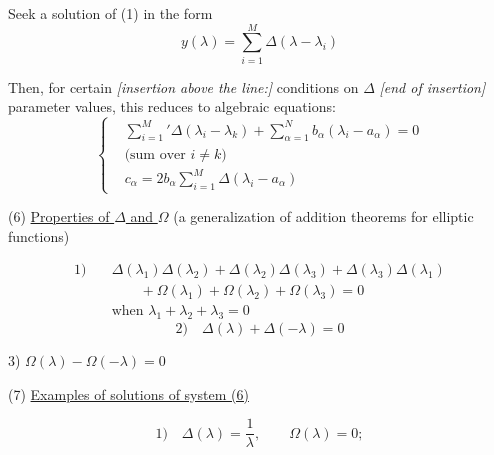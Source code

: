 Seek a solution of (1) in the form
\begin{equation*}
y(\lambda)=\sum_{i=1}^M\Delta(\lambda-\lambda_i)
\tag{4}
\end{equation*}

Then, for certain
\textit{[insertion above the line:]} conditions on $\Delta$
\textit{[end of insertion]}
parameter values, this reduces to algebraic equations:
\begin{equation*}
\left\{
\begin{aligned}
&\sum_{i=1}^{M}{}'\Delta(\lambda_i-\lambda_k)
 +\sum_{\alpha=1}^{N}b_\alpha(\lambda_i-a_\alpha)=0\\
&\text{(sum over }i\neq k\text{)}\\
&c_\alpha=2b_\alpha\sum_{i=1}^{M}\Delta(\lambda_i-a_\alpha)
\end{aligned}
\right.
\tag{5}
\end{equation*}

(6) \underline{Properties of $\Delta$ and $\Omega$}
\qquad (a generalization of addition theorems for elliptic functions)

\begin{equation*}
\begin{aligned}
1)\quad &\Delta(\lambda_1)\Delta(\lambda_2)+\Delta(\lambda_2)\Delta(\lambda_3)
+\Delta(\lambda_3)\Delta(\lambda_1)\\
&\qquad +\Omega(\lambda_1)+\Omega(\lambda_2)+\Omega(\lambda_3)=0\\
&\text{when }\lambda_1+\lambda_2+\lambda_3=0
\end{aligned}
\end{equation*}
\begin{equation*}
2)\quad \Delta(\lambda)+\Delta(-\lambda)=0
\end{equation*}

3) 
$\Omega(\lambda)-\Omega(-\lambda)=0$

(7) \underline{Examples of solutions of system (6)}

\begin{equation*}
1)\quad \Delta(\lambda)=\frac{1}{\lambda},\qquad \Omega(\lambda)=0;
\end{equation*}

